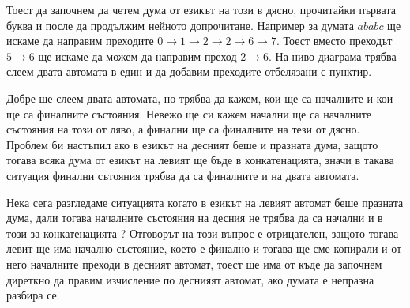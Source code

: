 \documentclass[12pt]{article}
\begin{document}
Тоест да започнем да четем дума от езикът на този в дясно, прочитайки първата буква и после да продължим нейното допрочитане.
Например за думата \(ababc\) ще искаме да направим преходите \(0 \to 1 \to 2 \to 2 \to 6 \to 7\).
Тоест вместо преходът \(5 \to 6\) ще искаме да можем да направим преход \(2 \to 6\). 
На ниво диаграма трябва слеем двата автомата в един и да добавим преходите отбелязани с пунктир.
\begin{center}
\end{center}
Добре ще слеем двата автомата, но трябва да кажем, кои ще са началните и кои ще са финалните състояния.
Невежо ще си кажем начални ще са началните състояния на този от ляво,
а финални ще са финалните на тези от дясно.
Проблем би настъпил ако в езикът на десният беше и празната дума, защото тогава всяка дума от езикът на левият ще бъде в конкатенацията,
значи в такава ситуация финални сътояния трябва да са финалните и на двата автомата. \\

\par Нека сега разгледаме ситуацията когато в езикът на левият автомат беше празната дума, дали тогава началните състояния на десния не трябва да са начални и в този за конкатенацията ? Отговорът на този въпрос е отрицателен, защото тогава левит ще има начално състояние, което е финално и тогава ще сме копирали и от него началните преходи в десният автомат, тоест ще има от къде да започнем диреткно да правим изчисление по деснияят автомат, ако думата е непразна разбира се. \\\par
\end{document}
